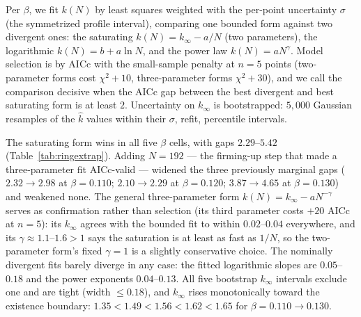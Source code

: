 \documentclass[pdflatex,sn-mathphys,Numbered]{sn-jnl}
\begin{document}
\begin{appendices}
Per $\beta$, we fit $k(N)$ by least squares weighted with the per-point
uncertainty $\sigma$ (the symmetrized profile interval), comparing one bounded
form against two divergent ones: the saturating
$k(N) = k_\infty - a/N$ (two parameters), the logarithmic $k(N) = b + a \ln N$,
and the power law $k(N) = a N^{\gamma}$. Model selection is by AICc with the
small-sample penalty at $n = 5$ points (two-parameter forms cost
$\chi^2 + 10$, three-parameter forms $\chi^2 + 30$), and we call the comparison
decisive when the AICc gap between the best divergent and best saturating form
is at least $2$. Uncertainty on $k_\infty$ is bootstrapped: $5{,}000$ Gaussian
resamples of the $\hat k$ values within their $\sigma$, refit, percentile
intervals.

The saturating form wins in all five $\beta$ cells, with gaps $2.29$--$5.42$
(Table~\ref{tab:ringextrap}). Adding $N = 192$ --- the firming-up step that made
a three-parameter fit AICc-valid --- widened the three previously marginal gaps
($2.32 \to 2.98$ at $\beta = 0.110$; $2.10 \to 2.29$ at $\beta = 0.120$;
$3.87 \to 4.65$ at $\beta = 0.130$) and weakened none. The general
three-parameter form $k(N) = k_\infty - a N^{-\gamma}$ serves as confirmation
rather than selection (its third parameter costs $+20$ AICc at $n = 5$): its
$k_\infty$ agrees with the bounded fit to within $0.02$--$0.04$ everywhere, and
its $\gamma \approx 1.1$--$1.6 > 1$ says the saturation is at least as fast as
$1/N$, so the two-parameter form's fixed $\gamma = 1$ is a slightly conservative
choice. The nominally divergent fits barely diverge in any case: the fitted
logarithmic slopes are $0.05$--$0.18$ and the power exponents $0.04$--$0.13$.
All five bootstrap $k_\infty$ intervals exclude one and are tight (width
$\le 0.18$), and $k_\infty$ rises monotonically toward the existence boundary:
$1.35 < 1.49 < 1.56 < 1.62 < 1.65$ for $\beta = 0.110 \to 0.130$.


\end{appendices}
\end{document}
